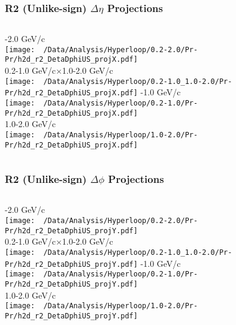 \documentclass{beamer}
\begin{document}
\begin{frame}
	\frametitle{R2 (Unlike-sign) $\Delta\eta$ Projections}
	\begin{columns}
		-2.0 GeV/c\\
		\texttt{[image: ~/Data/Analysis/Hyperloop/0.2-2.0/Pr-Pr/h2d\_r2\_DetaDphiUS\_projX.pdf]}\\0.2-1.0 GeV/c$\times$1.0-2.0 GeV/c\\
		\texttt{[image: ~/Data/Analysis/Hyperloop/0.2-1.0\_1.0-2.0/Pr-Pr/h2d\_r2\_DetaDphiUS\_projX.pdf]}
		-1.0 GeV/c\\
		\texttt{[image: ~/Data/Analysis/Hyperloop/0.2-1.0/Pr-Pr/h2d\_r2\_DetaDphiUS\_projX.pdf]}\\1.0-2.0 GeV/c\\
		\texttt{[image: ~/Data/Analysis/Hyperloop/1.0-2.0/Pr-Pr/h2d\_r2\_DetaDphiUS\_projX.pdf]}
	\end{columns}
\end{frame}
\begin{frame}
	\frametitle{R2 (Unlike-sign) $\Delta\phi$ Projections}
	\begin{columns}
		\column{0.5\textwidth}
		-2.0 GeV/c\\
		\texttt{[image: ~/Data/Analysis/Hyperloop/0.2-2.0/Pr-Pr/h2d\_r2\_DetaDphiUS\_projY.pdf]}\\0.2-1.0 GeV/c$\times$1.0-2.0 GeV/c\\
		\texttt{[image: ~/Data/Analysis/Hyperloop/0.2-1.0\_1.0-2.0/Pr-Pr/h2d\_r2\_DetaDphiUS\_projY.pdf]}
		\column{0.5\textwidth}
		-1.0 GeV/c\\
		\texttt{[image: ~/Data/Analysis/Hyperloop/0.2-1.0/Pr-Pr/h2d\_r2\_DetaDphiUS\_projY.pdf]}\\1.0-2.0 GeV/c\\
		\texttt{[image: ~/Data/Analysis/Hyperloop/1.0-2.0/Pr-Pr/h2d\_r2\_DetaDphiUS\_projY.pdf]}
	\end{columns}
\end{frame}
\end{document}
